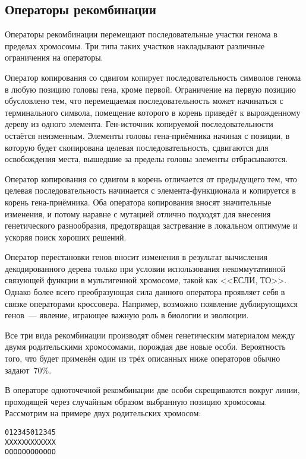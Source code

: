 \subsection{Операторы рекомбинации}

Операторы рекомбинации перемещают последовательные участки генома в пределах хромосомы. Три типа таких участков накладывают различные ограничения на операторы.

Оператор копирования со сдвигом копирует последовательность символов генома в любую позицию головы гена, кроме первой. Ограничение на первую позицию обусловлено тем, что перемещаемая последовательность может начинаться с терминального символа, помещение которого в корень приведёт к вырожденному дереву из одного элемента. Ген-источник копируемой последовательности остаётся неизменным. Элементы головы гена-приёмника начиная с позиции, в которую будет скопирована целевая последовательность, сдвигаются для освобождения места, вышедшие за пределы головы элементы отбрасываются.

Оператор копирования со сдвигом в корень отличается от предыдущего тем, что целевая последовательность начинается с элемента-функционала и копируется в корень гена-приёмника. Оба оператора копирования вносят значительные изменения, и потому наравне с мутацией отлично подходят для внесения генетического разнообразия, предотвращая застревание в локальном оптимуме и ускоряя поиск хороших решений.

Оператор перестановки генов вносит изменения в результат вычисления декодированного дерева только при условии использования некоммутативной связующей функции в мультигенной хромосоме, такой как <<ЕСЛИ, ТО>>. Однако более всего преобразующая сила данного оператора проявляет себя в связке операторами кроссовера. Например, возможно появление дублирующихся генов~--- явление, играющее важную роль в биологии и эволюции.

Все три вида рекомбинации производят обмен генетическим материалом между двумя родительскими хромосомами, порождая две новые особи. Вероятность того, что будет применён один из трёх описанных ниже операторов обычно задают~70\%.

В операторе одноточечной рекомбинации две особи скрещиваются вокруг линии, проходящей через случайным образом выбранную позицию хромосомы. Рассмотрим на примере двух родительских хромосом:

\begin{samepage}
\begin{alltt}
012345012345
XXXXXXXXXXXX
OOOOOOOOOOOO
\end{alltt}
\end{samepage}

